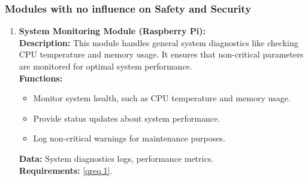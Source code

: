 \subsubsection{Modules with no influence on Safety and Security}
\begin{enumerate}
    \item \textbf{System Monitoring Module (Raspberry Pi):} \\ 
        \textbf{Description:} This module handles general system diagnostics like checking CPU temperature and memory usage. It ensures that non-critical parameters are monitored for optimal system performance. \\ 
        \textbf{Functions:}
        \begin{itemize}
            \item Monitor system health, such as CPU temperature and memory usage.
            \item Provide status updates about system performance.
            \item Log non-critical warnings for maintenance purposes.
        \end{itemize}
        \textbf{Data:} System diagnostics logs, performance metrics. \\ 
        \textbf{Requirements:} \ref{qreq.1}.
\end{enumerate}

